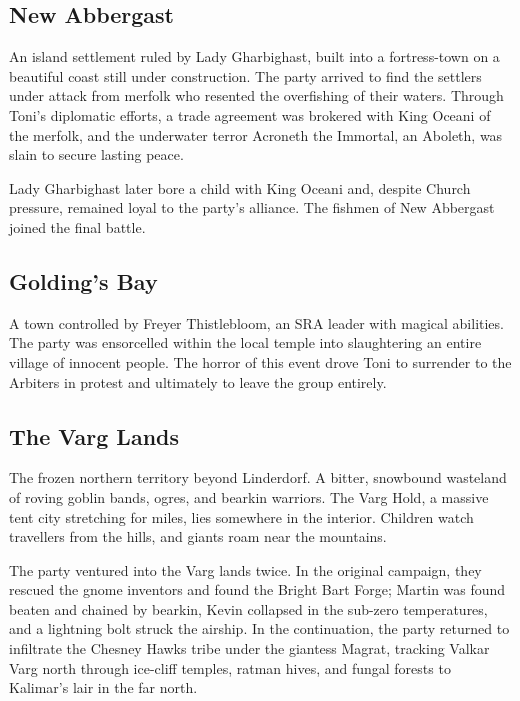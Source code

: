 \subsection*{New Abbergast}

An island settlement ruled by Lady Gharbighast, built into a fortress-town on a beautiful coast still under construction.  The party arrived to find the settlers under attack from merfolk who resented the overfishing of their waters.  Through Toni's diplomatic efforts, a trade agreement was brokered with King Oceani of the merfolk, and the underwater terror Acroneth the Immortal, an Aboleth, was slain to secure lasting peace.

Lady Gharbighast later bore a child with King Oceani and, despite Church pressure, remained loyal to the party's alliance.  The fishmen of New Abbergast joined the final battle.

\smallskip

\subsection*{Golding's Bay}

A town controlled by Freyer Thistlebloom, an SRA leader with magical abilities.  The party was ensorcelled within the local temple into slaughtering an entire village of innocent people.  The horror of this event drove Toni to surrender to the Arbiters in protest and ultimately to leave the group entirely.

\smallskip

\subsection*{The Varg Lands}

The frozen northern territory beyond Linderdorf.  A bitter, snowbound wasteland of roving goblin bands, ogres, and bearkin warriors.  The Varg Hold, a massive tent city stretching for miles, lies somewhere in the interior.  Children watch travellers from the hills, and giants roam near the mountains.

The party ventured into the Varg lands twice.  In the original campaign, they rescued the gnome inventors and found the Bright Bart Forge; Martin was found beaten and chained by bearkin, Kevin collapsed in the sub-zero temperatures, and a lightning bolt struck the airship.  In the continuation, the party returned to infiltrate the Chesney Hawks tribe under the giantess Magrat, tracking Valkar Varg north through ice-cliff temples, ratman hives, and fungal forests to Kalimar's lair in the far north.

